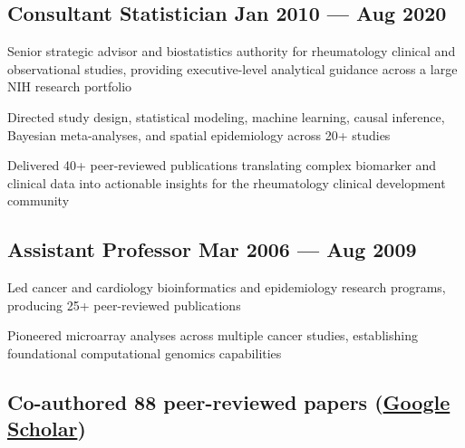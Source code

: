 \subsection{{Consultant Statistician \hfill Jan 2010 --- Aug 2020}}
\begin{zitemize}
    \item Senior strategic advisor and biostatistics authority for rheumatology clinical and observational studies, providing executive-level analytical guidance across a large NIH research portfolio
    \item Directed study design, statistical modeling, machine learning, causal inference, Bayesian meta-analyses, and spatial epidemiology across 20+ studies
    \item Delivered 40+ peer-reviewed publications translating complex biomarker and clinical data into actionable insights for the rheumatology clinical development community
\end{zitemize}

\subsection{{Assistant Professor \hfill Mar 2006 --- Aug 2009}}
\begin{zitemize}
    \item Led cancer and cardiology bioinformatics and epidemiology research programs, producing 25+ peer-reviewed publications
    \item Pioneered microarray analyses across multiple cancer studies, establishing foundational computational genomics capabilities
\end{zitemize}

\subsection{Co-authored 88 peer-reviewed papers (\href{https://scholar.google.com/citations?hl=en&user=EgaGUCwAAAAJ}{Google Scholar})}
